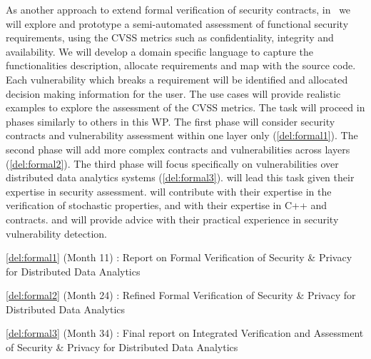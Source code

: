 \begin{Workpackage}{\thewpno}
\begin{Task}
\end{Task}


\begin{Task}

\TaskResults{%
\ref{del:formal1},
\ref{del:formal2},
\ref{del:formal3}
}
\TaskHeader{}
As another approach to extend formal verification of security contracts, in \theTask\ we will explore and prototype a semi-automated assessment of functional security requirements, using the CVSS metrics such as confidentiality, integrity and availability.
We will develop a domain specific language to capture the functionalities description, allocate requirements and map with the source code. Each vulnerability which breaks a requirement will be identified and allocated decision making information for the user.
The use cases will provide realistic examples to explore the assessment of the CVSS metrics.
The task will proceed in phases similarly to others in this WP. The first phase will consider security contracts and vulnerability assessment within one layer only (\ref{del:formal1}). The second phase will add more complex contracts and vulnerabilities across layers (\ref{del:formal2}). The third phase will focus specifically on vulnerabilities over distributed data analytics systems (\ref{del:formal3}).
\YAGshort will lead this task given their expertise in security assessment. \SA will contribute with their expertise in the verification of stochastic properties, and \UCM with their expertise in C++ and contracts. \IBMshort and \SOPRAshort will provide advice with their  practical experience in security vulnerability detection.

\end{Task}


\begin{WPDeliverables}
  \begin{compactitem}
  \item \ref{del:formal1} (Month 11) : Report on Formal Verification of Security \& Privacy for Distributed Data Analytics
\item \ref{del:formal2} (Month 24) : 
Refined Formal Verification of Security \& Privacy for Distributed Data Analytics 
\item \ref{del:formal3} (Month 34) : Final report on Integrated Verification and Assessment of Security \& Privacy for Distributed Data Analytics 
\end{compactitem}
\end{WPDeliverables}
\end{Workpackage}
